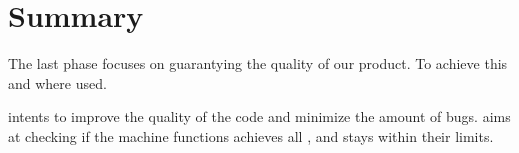 \section{Summary}
The last phase focuses on guarantying the quality of our product. To achieve this  and  where used.

 intents to improve the quality of the code and minimize the amount of bugs.  aims at checking if the machine functions achieves all , and stays within their limits.